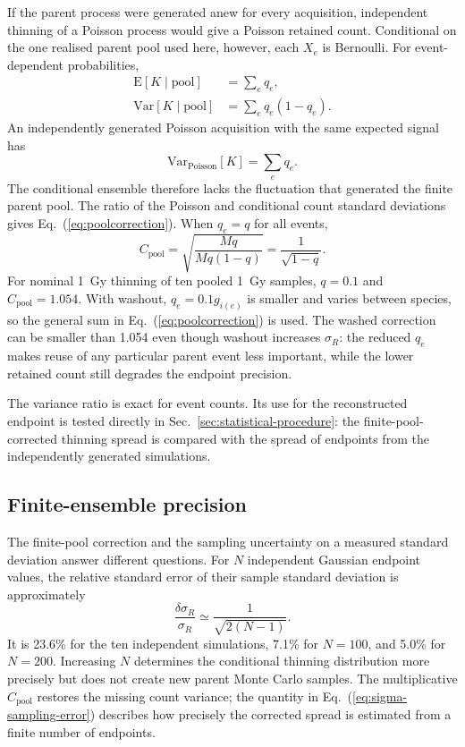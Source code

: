 \documentclass[11pt]{article}
\begin{document}
If the parent process were generated anew for every acquisition, independent
thinning of a Poisson process would give a Poisson retained count. Conditional
on the one realised parent pool used here, however, each $X_e$ is Bernoulli.
For event-dependent probabilities,
%
\begin{align}
  \mathrm{E}[K\mid\mathrm{pool}] &= \sum_e q_e, \\
  \mathrm{Var}[K\mid\mathrm{pool}] &= \sum_e q_e(1-q_e).
  \label{eq:conditional-counts}
\end{align}
%
An independently generated Poisson acquisition with the same expected signal
has
%
\begin{equation}
  \mathrm{Var}_{\mathrm{Poisson}}[K]=\sum_e q_e.
  \label{eq:poisson-counts}
\end{equation}
%
The conditional ensemble therefore lacks the fluctuation that generated the
finite parent pool. The ratio of the Poisson and conditional count standard
deviations gives Eq.~(\ref{eq:poolcorrection}). When $q_e=q$ for all events,
%
\begin{equation}
  C_{\mathrm{pool}} =
  \sqrt{\frac{Mq}{Mq(1-q)}}=\frac{1}{\sqrt{1-q}}.
  \label{eq:uniform-pool-correction}
\end{equation}
%
For nominal \SI{1}{\gray} thinning of ten pooled \SI{1}{\gray} samples,
$q=0.1$ and $C_{\mathrm{pool}}=1.054$. With washout,
$q_e=0.1g_{i(e)}$ is smaller and varies between species, so the general sum in
Eq.~(\ref{eq:poolcorrection}) is used. The washed correction can be smaller
than 1.054 even though washout increases $\sigma_R$: the reduced $q_e$ makes
reuse of any particular parent event less important, while the lower retained
count still degrades the endpoint precision.

The variance ratio is exact for event counts. Its use for the reconstructed
endpoint is tested directly in Sec.~\ref{sec:statistical-procedure}: the
finite-pool-corrected thinning spread is compared with the spread of endpoints
from the independently generated simulations.

\subsection{Finite-ensemble precision}

The finite-pool correction and the sampling uncertainty on a measured standard
deviation answer different questions. For $N$ independent Gaussian endpoint
values, the relative standard error of their sample standard deviation is
approximately
%
\begin{equation}
  \frac{\delta\sigma_R}{\sigma_R}
  \simeq \frac{1}{\sqrt{2(N-1)}}.
  \label{eq:sigma-sampling-error}
\end{equation}
%
It is 23.6\% for the ten independent simulations, 7.1\% for $N=100$, and 5.0\%
for $N=200$. Increasing $N$ determines the conditional thinning distribution
more precisely but does not create new parent Monte Carlo samples. The
multiplicative $C_{\mathrm{pool}}$ restores the missing count variance; the
quantity in Eq.~(\ref{eq:sigma-sampling-error}) describes how precisely the
corrected spread is estimated from a finite number of endpoints.
\end{document}

